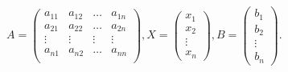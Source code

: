 \documentclass[12pt]{article}
\begin{document}
$ \begin{equation*}A=\begin{pmatrix}a_{11} & a_{12} & \ldots & a_{1n} \\a_{21} & a_{22} & \ldots & a_{2n} \\\vdots & \vdots & \vdots & \vdots \\a_{n1} & a_{n2} & \ldots & a_{nn} \\\end{pmatrix}, X=\begin{pmatrix}x_1 \\x_2 \\\vdots \\x_n\end{pmatrix}, B = \begin{pmatrix}b_1 \\b_2 \\\vdots \\b_n\end{pmatrix}.\end{equation*} $
\end{document}

